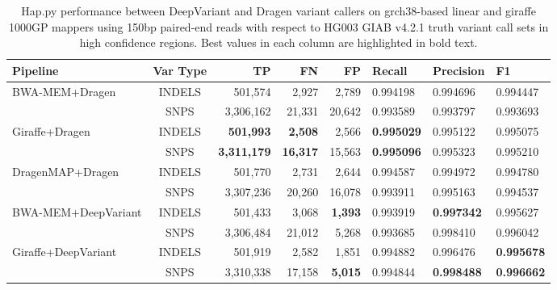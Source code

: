 \documentclass[11pt]{ucscthesis}
\begin{document}
\begin{landscape}
\begin{table}[H]
    \centering
    \begin{tabular}{|l|c|r|r|r|l|l|l|}
     \hline
    Pipeline                                     & Var Type & TP                & FN             & FP            & Recall            & Precision         & F1                \\
    \hline
    \multirow{2}{*}{BWA-MEM+Dragen}           & INDELS    & 501,574           & 2,927          & 2,789         & 0.994198          & 0.994696      & 0.994447 \\
                                                & SNPS      & 3,306,162         & 21,331         & 20,642        & 0.993589          & 0.993797      & 0.993693 \\
    \hline
    \multirow{2}{*}{Giraffe+Dragen}           & INDELS    & \textbf{501,993}  & \textbf{2,508} & 2,566         & \textbf{0.995029} & 0.995122      & 0.995075 \\
                                                & SNPS      & \textbf{3,311,179}& \textbf{16,317}& 15,563        & \textbf{0.995096} & 0.995323      & 0.995210 \\
    \hline
    \multirow{2}{*}{DragenMAP+Dragen}        & INDELS    & 501,770           & 2,731          & 2,644         & 0.994587          & 0.994972      & 0.994780 \\
                                                & SNPS      & 3,307,236         & 20,260         & 16,078        & 0.993911          & 0.995163      & 0.994537 \\
    \hline
    \multirow{2}{*}{BWA-MEM+DeepVariant}      & INDELS    & 501,433           & 3,068          & \textbf{1,393}& 0.993919          & \textbf{0.997342} & 0.995627 \\
                                                & SNPS      & 3,306,484         & 21,012         & 5,268         & 0.993685          & 0.998410          & 0.996042 \\
    \hline
    \multirow{2}{*}{Giraffe+DeepVariant}      & INDELS    & 501,919           & 2,582          & 1,851         & 0.994882          & 0.996476          & \textbf{0.995678} \\
                                                & SNPS      & 3,310,338         & 17,158         & \textbf{5,015}& 0.994844          & \textbf{0.998488} & \textbf{0.996662} \\
    \hline
    \end{tabular}
\caption[Genotyping evaluation between DeepVariant calls of bwamem and giraffe 1000GP alignments against grch38-based references with Hap.py in HG003 using 35x 150bp paired-end reads]{Hap.py performance between DeepVariant and Dragen variant callers on grch38-based linear and giraffe 1000GP mappers using 150bp paired-end reads with respect to HG003 GIAB v4.2.1 truth variant call sets in high confidence regions. Best values in each column are highlighted in bold text.}
\label{tab:deepvariant_happy_high_conf_2x150_50x_hg003_grch38}
\end{table}
\end{landscape}
\end{document}
